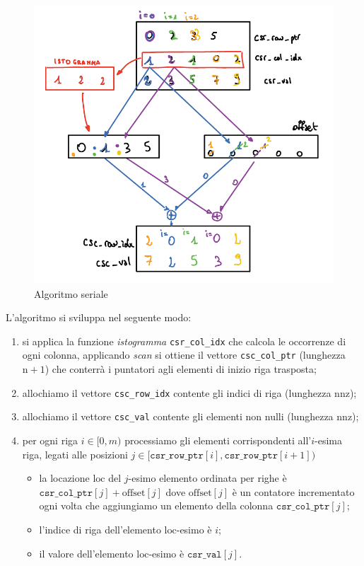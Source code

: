 \documentclass[]{IEEEtran}
\newcommand{\var}[1]{\texttt{#1}}
\begin{document}
\begin{figure}[htbp]
    \centering
	\includegraphics[scale=0.5]{transpose_algo_serial.PNG}
	\caption{Algoritmo seriale}
	\label{transpose_algo_serial}
\end{figure}

L'algoritmo si sviluppa nel seguente modo:
\begin{enumerate}
    \item si applica la funzione \emph{istogramma} \var{csr\_col\_idx} che calcola le occorrenze di ogni colonna, applicando \emph{scan} si ottiene il vettore \var{csc\_col\_ptr} (lunghezza $\mathrm{n}+1$) che conterrà i puntatori agli elementi di inizio riga trasposta;
    \item allochiamo il vettore \var{csc\_row\_idx} contente gli indici di riga (lunghezza $\mathrm{nnz}$);
    \item allochiamo il vettore \var{csc\_val} contente gli elementi non nulli (lunghezza $\mathrm{nnz}$);
    \item per ogni riga $i \in [0, m)$ processiamo gli elementi corrispondenti all'$i$-esima riga, legati alle posizioni $j \in [\var{csr\_row\_ptr}[i], \var{csr\_row\_ptr}[i+1])$
    \begin{itemize}
        \item la locazione $\mathrm{loc}$ del $j$-esimo elemento ordinata per righe è $\var{csr\_col\_ptr}[j] + \mathrm{offset}[j]$ dove $\mathrm{offset}[j]$ è un contatore incrementato ogni volta che aggiungiamo un elemento della colonna $\var{csr\_col\_ptr}[j]$;
        \item l'indice di riga dell'elemento $\mathrm{loc}$-esimo è $i$;
        \item il valore dell'elemento  $\mathrm{loc}$-esimo è $\var{csr\_val}[j]$.
    \end{itemize}
\end{enumerate}
\end{document}
